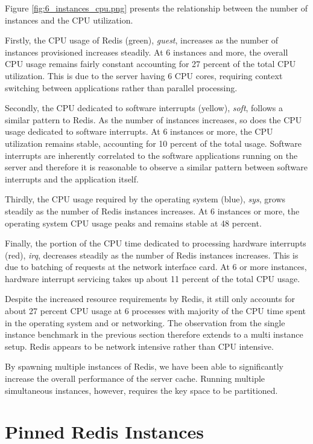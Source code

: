 Figure \ref{fig:6_instances_cpu.png} presents the relationship between the number of instances and the CPU utilization.

Firstly, the CPU usage of Redis (green), \textit{guest}, increases as the number of instances provisioned increases steadily. At 6 instances and more, the overall CPU usage remains fairly constant accounting for 27 percent of the total CPU utilization. This is due to the server having 6 CPU cores, requiring context switching between applications rather than parallel processing.

Secondly, the CPU dedicated to software interrupts (yellow), \textit{soft}, follows a similar pattern to Redis. As the number of instances increases, so does the CPU usage dedicated to software interrupts. At 6 instances or more, the CPU utilization remains stable, accounting for 10 percent of the total usage. Software interrupts are inherently correlated to the software applications running on the server and therefore it is reasonable to observe a similar pattern between software interrupts and the application itself.

Thirdly, the CPU usage required by the operating system (blue), \textit{sys}, grows steadily as the number of Redis instances increases. At 6 instances or more, the operating system CPU usage peaks and remains stable at 48 percent.

Finally, the portion of the CPU time dedicated to processing hardware interrupts (red), \textit{irq}, decreases steadily as the number of Redis instances increases. This is due to batching of requests at the network interface card. At 6 or more instances, hardware interrupt servicing takes up about 11 percent of the total CPU usage.

Despite the increased resource requirements by Redis, it still only accounts for about 27 percent CPU usage at 6 processes with majority of the CPU time spent in the operating system and or networking. The observation from the single instance benchmark in the previous section therefore extends to a multi instance setup. Redis appears to be network intensive rather than CPU intensive.


By spawning multiple instances of Redis, we have been able to significantly increase the overall performance of the server cache. Running multiple simultaneous instances, however, requires the key space to be partitioned.


\section{Pinned Redis Instances}

